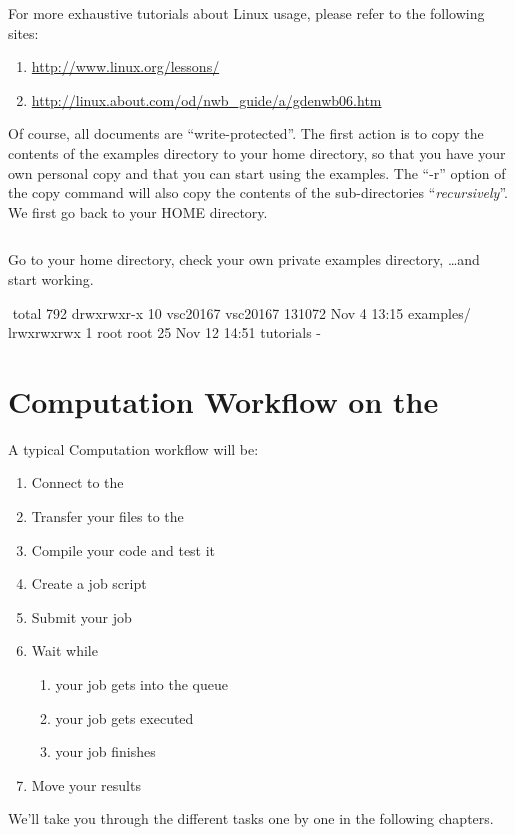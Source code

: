  For more exhaustive tutorials about Linux usage,
please refer to the following sites:

\begin{enumerate}
  \item \url{http://www.linux.org/lessons/}
  \item \url{http://linux.about.com/od/nwb\_guide/a/gdenwb06.htm}
\end{enumerate}

Of course, all documents are ``write-protected''. The first action is to copy
the contents of the \hpc examples directory to your home directory, so that you
have your own personal copy and that you can start using the examples. The
``-r'' option of the copy command will also copy the contents of the
sub-directories ``\emph{recursively}''.  We first go back to your HOME
directory.

\begin{prompt}
$ %
$ %
\end{prompt}

Go to your home directory, check your own private examples directory, \dots  and start working.

\begin{prompt}
$ %
$ %
total 792
drwxrwxr-x 10 vsc20167 vsc20167 131072 Nov  4 13:15 examples/
lrwxrwxrwx 1  root     root         25 Nov 12 14:51 tutorials -%
\end{prompt}

\section{Computation Workflow on the \hpc}
\label{sec:compuation-workflow-on-the-hpc}

A typical Computation workflow will be:

\begin{enumerate}
  \item  Connect to the \hpc
  \item  Transfer your files to the \hpc
  \item  Compile your code and test it
  \item  Create a job script
  \item  Submit your job
  \item  Wait while
  \begin{enumerate}
    \item  your job gets into the queue
    \item  your job gets executed
    \item  your job finishes
  \end{enumerate}
  \item  Move your results
\end{enumerate}

We'll take you through the different tasks one by one in the following
chapters.

